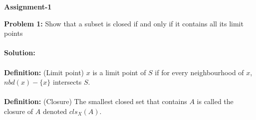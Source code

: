 \documentclass[main.tex]{subfiles}
\begin{document}
\begin{center}
\textbf{Assignment-1}
\end{center}
\textbf{Problem 1:} Show that a subset is closed if and only if it contains all its limit points
\\\\ \textbf{Solution:} 
\\\\ \textbf{Definition:} (Limit point) $x$ is a limit point of $S$ if for every neighbourhood of $x$, $nbd(x)-\{x\}$ intersects $S$. 
\\\\ \textbf{Definition:} (Closure) The smallest closed set that contains $A$ is called the closure of $A$ denoted $cls_X(A)$.
\end{document}
